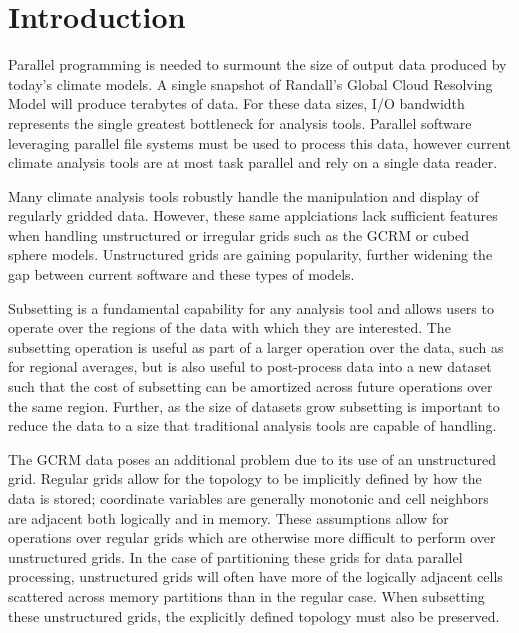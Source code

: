 \section{Introduction}
\label{section:introduction}

Parallel programming is needed to surmount the size of output data produced by
today's climate models.\cite{MODSIM07:LOT}  A single snapshot of Randall's
Global Cloud Resolving Model will produce terabytes of data.\cite{GCRM}  For
these data sizes, I/O bandwidth represents the single greatest bottleneck for
analysis tools.  Parallel software leveraging parallel file systems must be
used to process this data, however current climate analysis tools are at most
task parallel and rely on a single data reader.\cite{CDAT}\cite{CDO}\cite{NCO}

Many climate analysis tools robustly handle the manipulation and display of
regularly gridded data.  However, these same applciations lack sufficient
features when handling unstructured or irregular grids such as the GCRM or
cubed sphere models\cite{CUBE}.  Unstructured grids are gaining popularity,
further widening the gap between current software and these types of models.

Subsetting is a fundamental capability for any analysis tool and allows users
to operate over the regions of the data with which they are interested. The
subsetting operation is useful as part of a larger operation over the data,
such as for regional averages, but is also useful to post-process data into a
new dataset such that the cost of subsetting can be amortized across future
operations over the same region. Further, as the size of datasets grow
subsetting is important to reduce the data to a size that traditional analysis
tools are capable of handling. 

The GCRM data poses an additional problem due to its use of an unstructured
grid.  Regular grids allow for the topology to be implicitly defined by how
the data is stored; coordinate variables are generally monotonic and cell
neighbors are adjacent both logically and in memory. These assumptions allow
for operations over regular grids which are otherwise more difficult to
perform over unstructured grids. In the case of partitioning these grids for
data parallel processing, unstructured grids will often have more of the
logically adjacent cells scattered across memory partitions than in the
regular case.  When subsetting these unstructured grids, the explicitly
defined topology must also be preserved.

